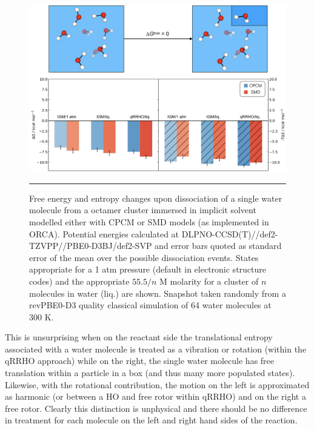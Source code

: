 \documentclass[../main.tex]{subfiles}
\begin{document}
\begin{figure}[h!]
	\centering
	\vspace{1.0cm}
	\includegraphics[width=\textwidth]{4/figs/figX2/figX2}
	\vspace{0.2cm}
	\hrule
	\caption{Free energy and entropy changes upon dissociation of a single water molecule from a octamer cluster immersed in implicit solvent modelled either with CPCM or SMD models (as implemented in ORCA). Potential energies calculated at DLPNO-CCSD(T)//def2-TZVPP//PBE0-D3BJ/def2-SVP and  error bars quoted as standard error of the mean over the possible dissociation events. States appropriate for a 1 atm pressure (default in electronic structure codes) and the appropriate $55.5/n$ M  molarity for a cluster of $n$ molecules in water (liq.) are shown. Snapshot taken randomly from a revPBE0-D3 quality classical simulation of 64 water molecules at 300 K.}
	\label{fig::entropy_X2}
\end{figure}

This is unsurprising when on the reactant side the translational entropy associated with a water molecule is treated as a vibration or rotation (within the qRRHO\cite{Grimme2012} approach) while on the right, the single water molecule has free translation within a particle in a box (and thus many more populated states). Likewise, with the rotational contribution, the motion on the left is approximated as harmonic (or between a HO and free rotor within qRRHO) and on the right a free rotor. Clearly this distinction is unphysical and there should be no difference in treatment for each molecule on the left and right hand sides of the reaction.
\end{document}
